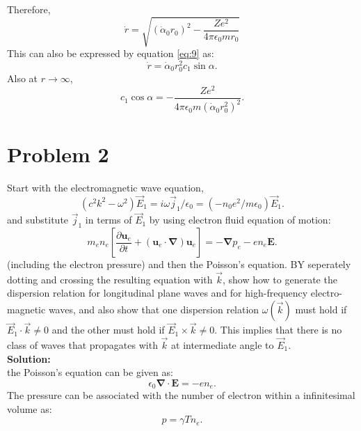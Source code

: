 \documentclass[11pt]{amsart}
\begin{document}
Therefore,
\begin{equation}
\label{eq:11}
\dot{r}=\sqrt{(\dot{\alpha}_0 r_{0})^2-\frac{Ze^2}{4 \pi \epsilon_0 m r_{0}}}
\end{equation}
This can also be expressed by equation \ref{eq:9} as:
\begin{equation}
\label{eq:12}
\dot{r}=\dot{\alpha}_0 r_{0}^2 c_1 \sin \alpha .
\end{equation}
Also at $r\rightarrow \infty$, 
\begin{equation}
\label{eq:13}
 c_1 \cos \alpha = -\frac{Ze^2}{4 \pi \epsilon_0 m(\dot{\alpha}_0 r_{0}^2)^2}.
\end{equation}
\newpage
 \section*{Problem 2 }
Start with the electromagnetic wave equation,
\begin{equation*}
(c^2 k^2 -\omega^2)\vec{E}_1=i\omega \vec{j}_1/\epsilon_0=(-n_0 e^2/m \epsilon_0)\vec{E}_1.
\end{equation*}
and substitute $\vec{j}_1$ in terms of $\vec{E}_1$ by using electron fluid equation of motion:
 \begin{equation*}
 m_e n_e \left [\frac{\partial \mathbf{u}_e}{\partial t}+ \left ( \mathbf{u}_{e}\cdot \mathbf{\nabla}\right )\mathbf{u}_e \right ]=-\mathbf{\nabla}p_e- e n_e  \mathbf{E}.
\end{equation*}
(including the electron pressure) and then the Poisson's equation. BY seperately dotting and crossing the resulting equation with $\vec{k}$, show how to generate the dispersion relation for longitudinal plane waves and for high-frequency electro-magnetic waves, and also show that one dispersion relation $\omega(\vec{k})$ must hold if $\vec{E}_1 \cdot \vec{k} \neq 0$ and the other must hold if $\vec{E}_1 \times \vec{k} \neq 0$. This implies that there is no class of waves that propagates with $\vec{k}$ at intermediate angle to $\vec{E}_1$.
\\
\textbf{Solution:}\\
the Poisson's equation can be given as:
\begin{equation}
\label{eq:14}
\epsilon_0 \mathbf{\nabla}\cdot \mathbf{E}=-e n_e.
\end{equation}
The pressure can be associated with the number of electron within a infinitesimal volume as:
\begin{equation}
\label{eq:15}
p=\gamma T n_e.
\end{equation}
\end{document}
